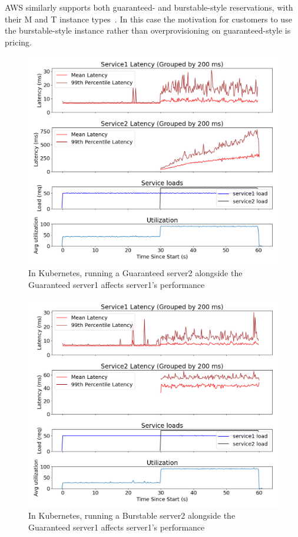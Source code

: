 AWS similarly supports both guaranteed- and burstable-style reservations, with
their M and T instance types~\cite{aws-ec2-burstable,aws-ec2-resources}. In this
case the motivation for customers to use the burstable-style instance rather
than overprovisioning on guaranteed-style is pricing.


\begin{figure}[t]
    \centering
    \includegraphics[width=\columnwidth]{graphs/kubernetes-lc-guar.png}
    \caption{In Kubernetes, running a Guaranteed server2 alongside the
    Guaranteed server1 affects server1's
    performance}\label{fig:kubernetes-lc-guar}
\end{figure}

\begin{figure}[t]
    \centering
    \includegraphics[width=\columnwidth]{graphs/kubernetes-lc-burst.png}
    \caption{In Kubernetes, running a Burstable server2 alongside the Guaranteed
    server1 affects server1's performance}\label{fig:kubernetes-lc-burst}
\end{figure}

